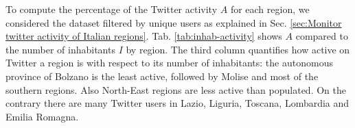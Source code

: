 \documentclass[prb,twocolumn,9pt]{revtex4-1}
\begin{document}
To compute the percentage of the Twitter activity $A$ for each region, we considered the dataset filtered by unique users as explained in Sec. \ref{sec:Monitor twitter activity of Italian regions}.
Tab. \ref{tab:inhab-activity} shows $A$ compared to the number of inhabitants $I$ by region. The third column quantifies how active on Twitter a region is with respect to its number of inhabitants: the autonomous province of Bolzano is the least active, followed by Molise and most of the southern regions. Also North-East regions are less active than populated. On the contrary there are many Twitter users in Lazio, Liguria, Toscana, Lombardia and Emilia Romagna.


	\begin{figure}[t]
	\begin{minipage}[c]{0.49\linewidth}
	\centering
	\end{minipage}
	\begin{minipage}[]{0.49\linewidth}
	\centering

\end{minipage}
\end{figure}
\end{document}
